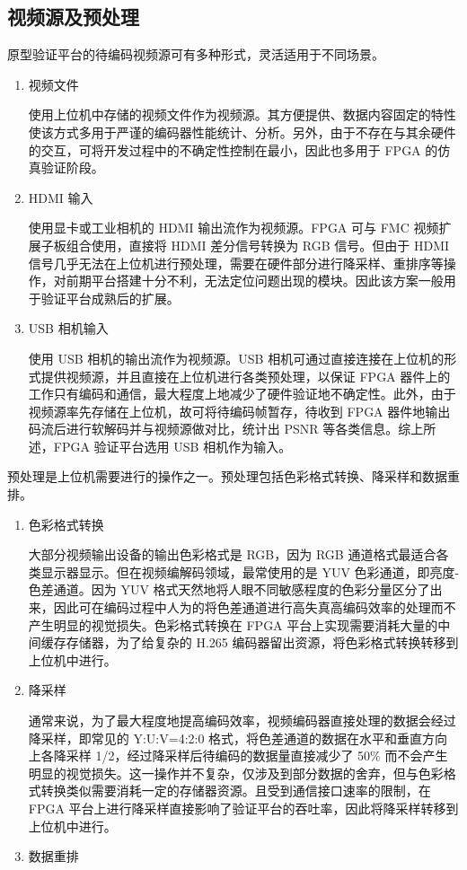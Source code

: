 \subsection{视频源及预处理}
原型验证平台的待编码视频源可有多种形式，灵活适用于不同场景。
\begin{enumerate}
    \item 视频文件

          使用上位机中存储的视频文件作为视频源。其方便提供、数据内容固定的特性使该方式多用于严谨的编码器性能统计、分析。另外，由于不存在与其余硬件的交互，可将开发过程中的不确定性控制在最小，因此也多用于 FPGA 的仿真验证阶段。

    \item HDMI 输入

          使用显卡或工业相机的 HDMI 输出流作为视频源。FPGA 可与 FMC 视频扩展子板组合使用，直接将 HDMI 差分信号转换为 RGB 信号。但由于 HDMI 信号几乎无法在上位机进行预处理，需要在硬件部分进行降采样、重排序等操作，对前期平台搭建十分不利，无法定位问题出现的模块。因此该方案一般用于验证平台成熟后的扩展。

    \item USB 相机输入

          使用 USB 相机的输出流作为视频源。USB 相机可通过直接连接在上位机的形式提供视频源，并且直接在上位机进行各类预处理，以保证 FPGA 器件上的工作只有编码和通信，最大程度上地减少了硬件验证地不确定性。此外，由于视频源率先存储在上位机，故可将待编码帧暂存，待收到 FPGA 器件地输出码流后进行软解码并与视频源做对比，统计出 PSNR 等各类信息。综上所述，FPGA 验证平台选用 USB 相机作为输入。
\end{enumerate}

预处理是上位机需要进行的操作之一。预处理包括色彩格式转换、降采样和数据重排。
\begin{enumerate}
    \item 色彩格式转换

          大部分视频输出设备的输出色彩格式是 RGB，因为 RGB 通道格式最适合各类显示器显示。但在视频编解码领域，最常使用的是 YUV 色彩通道，即亮度-色差通道。因为 YUV 格式天然地将人眼不同敏感程度的色彩分量区分了出来，因此可在编码过程中人为的将色差通道进行高失真高编码效率的处理而不产生明显的视觉损失。色彩格式转换在 FPGA 平台上实现需要消耗大量的中间缓存存储器，为了给复杂的 H.265 编码器留出资源，将色彩格式转换转移到上位机中进行。

    \item 降采样

          通常来说，为了最大程度地提高编码效率，视频编码器直接处理的数据会经过降采样，即常见的 Y:U:V=4:2:0 格式，将色差通道的数据在水平和垂直方向上各降采样 1/2，经过降采样后待编码的数据量直接减少了 50\% 而不会产生明显的视觉损失。这一操作并不复杂，仅涉及到部分数据的舍弃，但与色彩格式转换类似需要消耗一定的存储器资源。且受到通信接口速率的限制，在 FPGA 平台上进行降采样直接影响了验证平台的吞吐率，因此将降采样转移到上位机中进行。

    \item 数据重排


\end{enumerate}

